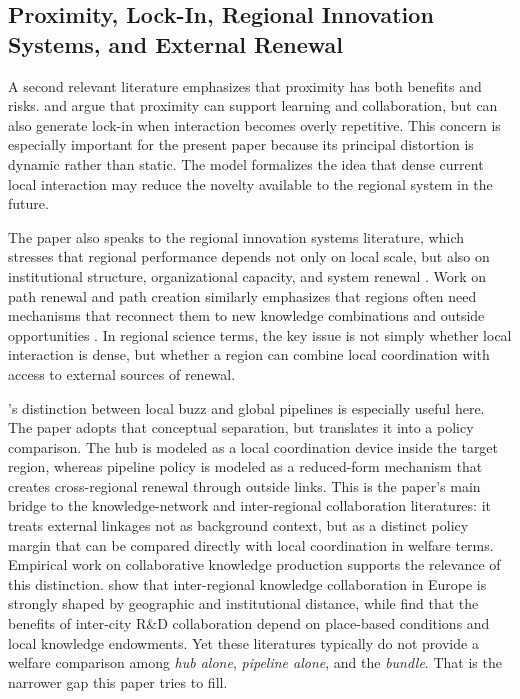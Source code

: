 \subsection{Proximity, Lock-In, Regional Innovation Systems, and External Renewal}

A second relevant literature emphasizes that proximity has both benefits and risks. \citet{Boschma2005} and \citet{TorreRallet2005} argue that proximity can support learning and collaboration, but can also generate lock-in when interaction becomes overly repetitive. This concern is especially important for the present paper because its principal distortion is dynamic rather than static. The model formalizes the idea that dense current local interaction may reduce the novelty available to the regional system in the future.

The paper also speaks to the regional innovation systems literature, which stresses that regional performance depends not only on local scale, but also on institutional structure, organizational capacity, and system renewal \citep{CookeUrangaEtxebarria1997,AsheimLawtonSmithOughton2011,TodtlingTrippl2005,CoenenAsheimBuggeHerstad2017}. Work on path renewal and path creation similarly emphasizes that regions often need mechanisms that reconnect them to new knowledge combinations and outside opportunities \citep{ChaminadeBellandiPlecheroSantini2019}. In regional science terms, the key issue is not simply whether local interaction is dense, but whether a region can combine local coordination with access to external sources of renewal.

\citet{BatheltMalmbergMaskell2004}'s distinction between local buzz and global pipelines is especially useful here. The paper adopts that conceptual separation, but translates it into a policy comparison. The hub is modeled as a local coordination device inside the target region, whereas pipeline policy is modeled as a reduced-form mechanism that creates cross-regional renewal through outside links. This is the paper's main bridge to the knowledge-network and inter-regional collaboration literatures: it treats external linkages not as background context, but as a distinct policy margin that can be compared directly with local coordination in welfare terms. Empirical work on collaborative knowledge production supports the relevance of this distinction. \citet{HoekmanFrenkenVanOort2009} show that inter-regional knowledge collaboration in Europe is strongly shaped by geographic and institutional distance, while \citet{NeulaendtnerScherngellLiuJiDingPaier2025} find that the benefits of inter-city R\&D collaboration depend on place-based conditions and local knowledge endowments. Yet these literatures typically do not provide a welfare comparison among \emph{hub alone}, \emph{pipeline alone}, and the \emph{bundle}. That is the narrower gap this paper tries to fill.

